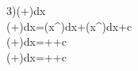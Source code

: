 3)\int\left(+\right)dx
\\\int\left(+\right)dx=\int\left(x^\right)dx+\int\left(x^\right)dx+c
\\\int\left(+\right)dx=++c
\\\int\left(+\right)dx=++c